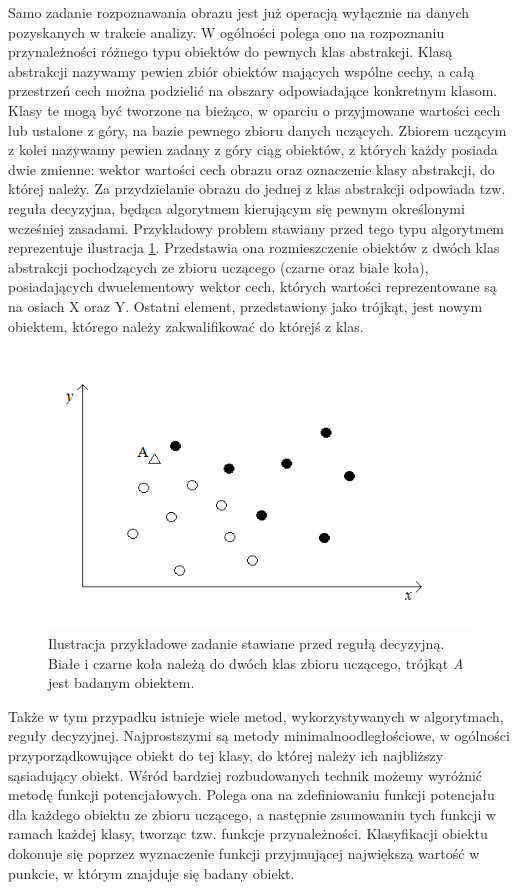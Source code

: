 Samo zadanie rozpoznawania obrazu jest już operacją wyłącznie na danych pozyskanych w trakcie analizy. W ogólności polega ono na rozpoznaniu przynależności różnego typu obiektów do pewnych klas abstrakcji\cite{Tadeusiewicz_flasinski}. Klasą abstrakcji nazywamy pewien zbiór obiektów mających wspólne cechy, a całą przestrzeń cech można podzielić na obszary odpowiadające konkretnym klasom. Klasy te mogą być tworzone na bieżąco, w oparciu o przyjmowane wartości cech lub ustalone z góry, na bazie pewnego zbioru danych uczących. Zbiorem uczącym z kolei nazywamy pewien zadany z góry ciąg obiektów, z których każdy posiada dwie zmienne: wektor wartości cech obrazu oraz oznaczenie klasy abstrakcji, do której należy\cite{Materka}. Za przydzielanie obrazu do jednej z klas abstrakcji odpowiada tzw. reguła decyzyjna, będąca algorytmem kierującym się pewnym określonymi wcześniej zasadami. Przykładowy problem stawiany przed tego typu algorytmem reprezentuje ilustracja \ref{zbior}. Przedstawia ona rozmieszczenie obiektów z dwóch klas abstrakcji pochodzących ze zbioru uczącego (czarne oraz białe koła), posiadających dwuelementowy wektor cech, których wartości reprezentowane są na osiach X oraz Y. Ostatni element, przedstawiony jako trójkąt, jest nowym obiektem, którego należy zakwalifikować do którejś z klas.

\begin{figure}[H]
\begin{center}
\includegraphics[scale=0.6]{imgs/hardtask2.png}
\caption[Przykładowe zadanie reguły decyzyjnej.]{\small{Ilustracja przykładowe zadanie stawiane przed regułą decyzyjną. Białe i czarne koła należą do dwóch klas zbioru uczącego, trójkąt \textit{A} jest badanym obiektem.}}
\label{zbior}
\end{center}
\end{figure}

Także w tym przypadku istnieje wiele metod, wykorzystywanych w algorytmach, reguły decyzyjnej. Najprostszymi są metody minimalnoodległościowe, w ogólności przyporządkowujące obiekt do tej klasy, do której należy ich najbliższy sąsiadujący obiekt. Wśród bardziej rozbudowanych technik możemy wyróżnić metodę funkcji potencjałowych. Polega ona na zdefiniowaniu funkcji potencjału dla każdego obiektu ze zbioru uczącego, a następnie zsumowaniu tych funkcji w ramach każdej klasy, tworząc tzw. funkcje przynależności. Klasyfikacji obiektu dokonuje się poprzez wyznaczenie funkcji przyjmującej największą wartość w punkcie, w którym znajduje się badany obiekt.
